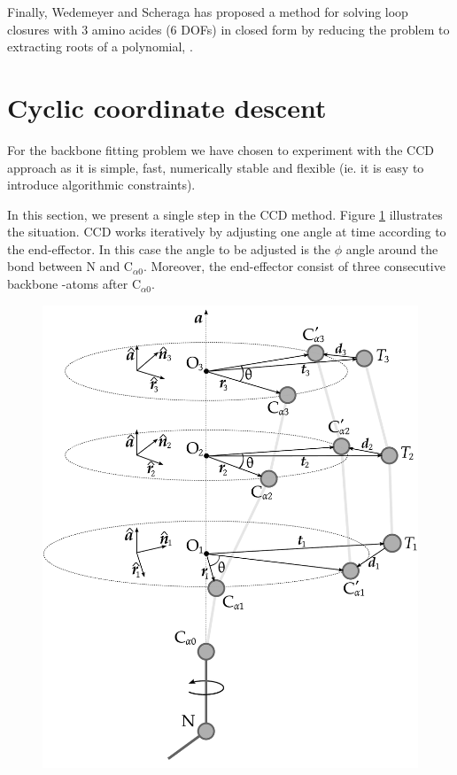 Finally, Wedemeyer and Scheraga has proposed a method for solving loop closures with 3 amino acides (6 DOFs) in closed form by reducing the problem to extracting roots of a polynomial, \cite{wedemeyer1999exact}.


\section{Cyclic coordinate descent}
For the backbone fitting problem we have chosen to experiment with the CCD approach as it is simple, fast, numerically stable and flexible (ie. it is easy to introduce algorithmic constraints).

In this section, we present a single step in the CCD method.
Figure \ref{fig:ccd} illustrates the situation.
CCD works iteratively by adjusting one angle at time according to the end-effector.
In this case the angle to be adjusted is the $\phi$ angle around the bond between N and C$_{\alpha0}$. Moreover, the end-effector consist of three consecutive backbone \Ca-atoms after C$_{\alpha0}$.

\begin{figure}
  \centering
	\includegraphics[width=0.98\columnwidth]{figures/ccd}
  \caption{}
  \label{fig:ccd}
\end{figure}


